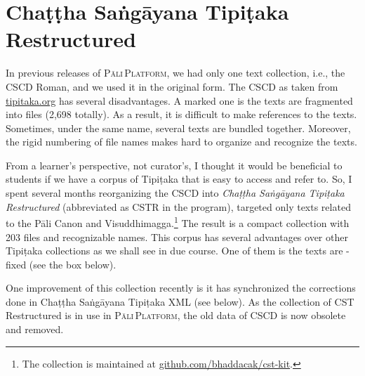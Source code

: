 
\section{Chaṭṭha Saṅgāyana Tipiṭaka Restructured}

In previous releases of \textsc{Pāli\,Platform}, we had only one text collection, i.e., the CSCD Roman, and we used it in the original form. The CSCD as taken from \url{tipitaka.org} has several disadvantages. A marked one is the texts are fragmented into files (2,698 totally). As a result, it is difficult to make references to the texts. Sometimes, under the same name, several texts are bundled together. Moreover, the rigid numbering of file names makes hard to organize and recognize the texts.

From a learner's perspective, not curator's, I thought it would be beneficial to students if we have a corpus of Tipiṭaka that is easy to access and refer to. So, I spent several months reorganizing the CSCD into \emph{Chaṭṭha Saṅgāyana Tipiṭaka Restructured} (abbreviated as CSTR in the program), targeted only texts related to the Pāli Canon and Visuddhimagga.\footnote{The collection is maintained at \url{github.com/bhaddacak/cst-kit}.} The result is a compact collection with 203 files and recognizable names. This corpus has several advantages over other Tipiṭaka collections as we shall see in due course. One of them is the texts are -fixed (see the box below).

One improvement of this collection recently is it has synchronized the corrections done in Chaṭṭha Saṅgāyana Tipiṭaka XML (see below). As the collection of CST Restructured is in use in \textsc{Pāli\,Platform}, the old data of CSCD is now obsolete and removed.

